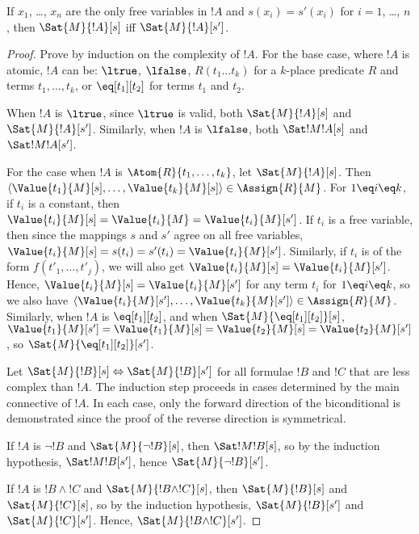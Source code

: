 \documentclass[../../include/open-logic-section]{subfiles}
\begin{document}
\begin{prop}
If $x_1$, \dots, $x_n$ are the only free variables in $!A$ and $s(x_i)
= s'(x_i)$ for $i = 1$, \dots, $n$, then $\Sat{M}{!A}[s]$ iff
$\Sat{M}{!A}[s']$.
\end{prop}

\begin{proof}

Prove by induction on the complexity of $!A$. For the base case, where
$!A$ is atomic, $!A$ can be: $\ltrue$, $\lfalse$, $R(t_1 \ldots t_k)$
for a $k$-place predicate $R$ and terms $t_1,\ldots,t_k$, or
$\eq[t_1][t_2]$ for terms $t_1$ and $t_2$.

When $!A$ is $\ltrue$, since $\ltrue$ is valid, both $\Sat{M}{!A}[s]$
and $\Sat{M}{!A}[s']$. Similarly, when $!A$ is $\lfalse$, both
$\Sat!{M}{!A}[s]$ and $\Sat!{M}{!A}[s']$.

For the case when $!A$ is $\Atom{R}{t_1, \ldots, t_k}$, let
$\Sat{M}{!A}[s]$. Then $\langle \Value{t_1}{M}[s], \ldots,
\Value{t_k}{M}[s] \rangle \in \Assign{R}{M}$. For $1 \eq i \eq k$,
if $t_i$ is a constant, then $\Value{t_i}{M}[s] = \Value{t_i}{M} =
\Value{t_i}{M}[s']$. If $t_i$ is a free variable, then since the
mappings $s$ and $s'$ agree on all free variables, $\Value{t_i}{M}[s]
= s(t_i) = s'(t_i) = \Value{t_i}{M}[s']$. Similarly, if $t_i$ is of
the form $f(t'_1,\ldots,t'_j)$, we will also get $\Value{t_i}{M}[s] =
\Value{t_i}{M}[s']$. Hence, $\Value{t_i}{M}[s] = \Value{t_i}{M}[s']$
for any term $t_i$ for $1 \eq i \eq k$, so we also have $\langle
\Value{t_i}{M}[s'], \ldots, \Value{t_k}{M}[s'] \rangle \in
\Assign{R}{M}$. Similarly, when $!A$ is $\eq[t_1][t_2]$, and when
$\Sat{M}{\eq[t_1][t_2]}[s]$, $\Value{t_1}{M}[s'] = \Value{t_1}{M}[s] =
\Value{t_2}{M}[s] = \Value{t_2}{M}[s']$, so $\Sat{M}{\eq[t_1][t_2]}[s']$.

Let $\Sat{M}{!B}[s] \Leftrightarrow \Sat{M}{!B}[s']$ for all formulae
$!B$ and $!C$ that are less complex than $!A$. The induction step
proceeds in cases determined by the main connective of $!A$. In each
case, only the forward direction of the biconditional is demonstrated
since the proof of the reverse direction is symmetrical.

If $!A$ is $\lnot !B$ and $\Sat{M}{\lnot !B}[s]$, then
$\Sat!{M}{!B}[s]$, so by the induction hypothesis, $\Sat!{M}{!B}[s']$,
hence $\Sat{M}{\lnot !B}[s']$.

If $!A$ is $!B \land !C$ and $\Sat{M}{!B \land !C}[s]$, then
$\Sat{M}{!B}[s]$ and $\Sat{M}{!C}[s]$, so by the induction hypothesis,
$\Sat{M}{!B}[s']$ and $\Sat{M}{!C}[s']$. Hence, $\Sat{M}{!B \land
  !C}[s']$.


\end{proof}
\end{document}
